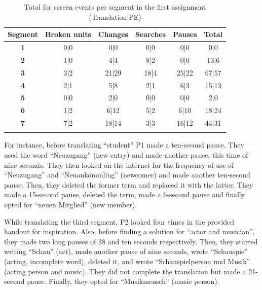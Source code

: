 \begin{table}[ht]
    \caption[Total of screen events per segment in the first assignment]{Total for screen events per segment in the first assignment (Translation|PE)}
    \centering
    \begin{tabular}{cccccc} \lsptoprule
        \textbf{Segment} & \textbf{Broken units} & \textbf{Changes} & \textbf{Searches} & \textbf{Pauses} & \textbf{Total}\\
\midrule
        \textbf{1} & 0|0 & 0|0 & 0|0 & 0|0 & 0|0 \\
        \textbf{2} & 1|0 & 4|4 & 8|2 & 0|0 & 13|6 \\
        \textbf{3} & 3|2 & \cellcolor{red!25}21|29 & \cellcolor{red!25}18|4 & \cellcolor{red!25}25|22 & \cellcolor{red!25}67|57 \\
        \textbf{4} & 2|1 & 5|8 & 2|1 & 6|3 & 15|13 \\
        \textbf{5} & 0|0 & 2|0 & 0|0 & 0|0 & 2|0 \\
        \textbf{6} & 1|2 & 6|12 & 5|2 & 6|10 & 18|24 \\
        \textbf{7} & 7|2 & \cellcolor{red!25}18|14 & 3|3 & \cellcolor{red!25}16|12 & \cellcolor{red!25}44|31 \\
\lspbottomrule
    \end{tabular}
    \label{tab:technicaleffort_segment_first}
\end{table}

For instance, before translating ``student'' P1 made a ten-second pause. They used the word ``Neuzugang'' (new entry) and made another pause, this time of nine seconds. They then looked on the internet for the frequency of use of ``Neuzugang'' and ``Neuankömmling'' (newcomer) and made another ten-second pause. Then, they deleted the former term and replaced it with the latter. They made a 15-second pause, deleted the term, made a 6-second pause and finally opted for ``neuen Mitglied'' (new member). 

While translating the third segment, P2 looked four times in the provided handout for inspiration. Also, before finding a solution for ``actor and musician'', they made two long pauses of 38 and ten seconds respectively. Then, they started writing ``Schau'' (act), made another pause of nine seconds, wrote ``Schauspie'' (acting, incomplete word), deleted it, and wrote ``Schauspielperson und Musik'' (acting person and music). They did not complete the translation but made a 21-second pause. Finally, they opted for ``Musikmensch'' (music person). 

